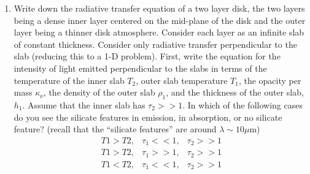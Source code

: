 \documentclass[twoside]{tufte-book} %
\begin{document}
\begin{enumerate}
\begin{enumerate}
    \end{enumerate}

    \item
        Write down the radiative transfer equation of a two layer disk, the two
        layers being a dense inner layer centered on the mid-plane of the disk
        and the outer layer being a thinner disk atmosphere. Consider each
        layer as an infinite slab of constant thickness. Consider only
        radiative transfer perpendicular to the slab (reducing this to a 1-D
        problem). First, write the equation for the intensity of light emitted
        perpendicular to the slabs in terms of the temperature of the inner
        slab $T_2$, outer slab temperature $T_1$, the opacity per mass $\kappa_\nu$, the
        density of the outer slab $\rho_1$, and the thickness of the outer slab, $h_1$.
        Assume that the inner slab has $\tau_{2}>>1$.  In which of the following
        cases do you see the silicate features in emission, in absorption, or
        no silicate feature?  (recall that the ``silicate features'' are around $\lambda\sim10\mu\mathrm{m}$)
\begin{eqnarray}
T1 > T2, & \tau_1 << 1, & \tau_2 >> 1\\
T1 > T2, & \tau_1 >> 1, & \tau_2 >> 1\\
T1 < T2, & \tau_1 << 1, & \tau_2 >> 1
\end{eqnarray}








\end{enumerate}
\end{document}

